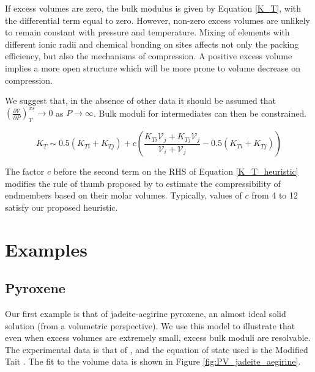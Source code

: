\documentclass[review]{elsarticle}
\begin{document}
If excess volumes are zero, the bulk modulus is given by Equation \ref{K_T}, with the differential term equal to zero. However, non-zero excess volumes are unlikely to remain constant with pressure and temperature. Mixing of elements with different ionic radii and chemical bonding on sites affects not only the packing efficiency, but also the mechanisms of compression. A positive excess volume implies a more open structure which will be more prone to volume decrease on compression.

We suggest that, in the absence of other data it should be assumed that $\left( \frac{\partial \mathcal{V}}{\partial P} \right)_T^{xs} \rightarrow 0$ as $P \rightarrow \infty$. Bulk moduli for intermediates can then be constrained. 

\begin{equation}
  K_{T} \sim 0.5(K_{Ti} + K_{Tj}) + c \left(\frac{K_{Ti}\mathcal{V}_{j} + K_{Tj}\mathcal{V}_{j}}{\mathcal{V}_{i} + \mathcal{V}_{j}} - 0.5(K_{Ti} + K_{Tj})\right)
  \label{K_T_heuristic}
\end{equation}

The factor $c$ before the second term on the RHS of Equation \ref{K_T_heuristic} modifies the rule of thumb proposed by \cite{AA1970} to estimate the compressibility of endmembers based on their molar volumes. Typically, values of $c$ from 4 to 12 satisfy our proposed heuristic.

\section{Examples}
\subsection{Pyroxene}
Our first example is that of jadeite-aegirine pyroxene, an almost ideal solid solution (from a volumetric perspective). We use this model to illustrate that even when excess volumes are extremely small, excess bulk moduli are resolvable. The experimental data is that of \cite{NBLBT2006}, and the equation of state used is the Modified Tait \citep{HP2011}. The fit to the volume data is shown in Figure \ref{fig:PV_jadeite_aegirine}.
\end{document}
